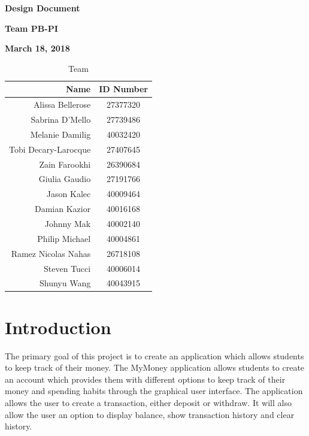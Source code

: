 \documentclass[12pt]{article}
\begin{document}
\vspace*{0.5in}
\centerline{\bf\Large Design Document}

\vspace*{0.5in}
\centerline{\bf\Large Team PB-PI}

\vspace*{0.5in}
\centerline{\bf\Large March 18, 2018}

\vspace*{1.5in}
\begin{table}[htbp]
\caption{Team}
\begin{center}
\begin{tabular}{|r | c|}
\hline
Name & ID Number \\
\hline\hline
Alissa Bellerose & 27377320 \\
Sabrina D'Mello & 27739486 \\
Melanie Damilig & 40032420 \\
Tobi Decary-Larocque & 27407645 \\
Zain Farookhi & 26390684 \\
Giulia Gaudio & 27191766 \\
Jason Kalec & 40009464 \\
Damian Kazior & 40016168 \\
Johnny Mak & 40002140 \\
Philip Michael & 40004861 \\
Ramez Nicolas Nahas & 26718108 \\
Steven Tucci & 40006014 \\
Shunyu Wang & 40043915 \\
\hline
\end{tabular}
\end{center}
\end{table}

\clearpage
\tableofcontents
\clearpage

\section{Introduction}
The primary goal of this project is to create an application which allows students to keep track of their money. The MyMoney application allows students to create an account which provides them with different options to keep track of their money and spending habits through the graphical user interface. The application allows the user to create a transaction, either deposit or withdraw. It will also allow the user an option to display balance, show transaction history and clear history. 
\end{document}
